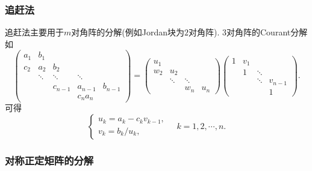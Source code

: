 \documentclass[hidelinks]{ctexart}
\begin{document}

\subsubsection{追赶法} %
\label{ssub:追赶法}

追赶法主要用于$m$对角阵的分解(例如Jordan块为$2$对角阵). $3$对角阵的Courant分解如
\[ \begin{pmatrix}
    a_1 & b_1 & & & \\
    c_2 & a_2 & b_2 & & \\
    & \ddots & \ddots & \ddots & \\
    & & c_{n-1} & a_{n-1} & b_{n-1} \\
    & & & c_n a_n
\end{pmatrix} = \begin{pmatrix}
    u_1 & & & \\
    w_2 & u_2 & & \\
    & \ddots & \ddots & \\
    & & w_n & u_n
\end{pmatrix} \begin{pmatrix}
    1 & v_1 & & \\
    & 1 & \ddots & \\
    & & \ddots & v_{n-1} \\
    & & & 1
\end{pmatrix}. \]
可得
\[ \begin{cases}
    u_k = a_k - c_k v_{k-1},\\
    v_k = b_k / u_k,
\end{cases}\quad k = 1,2,\cdots,n. \]


\subsubsection{对称正定矩阵的分解} %
\label{ssub:对称正定矩阵的分解}
\end{document}
